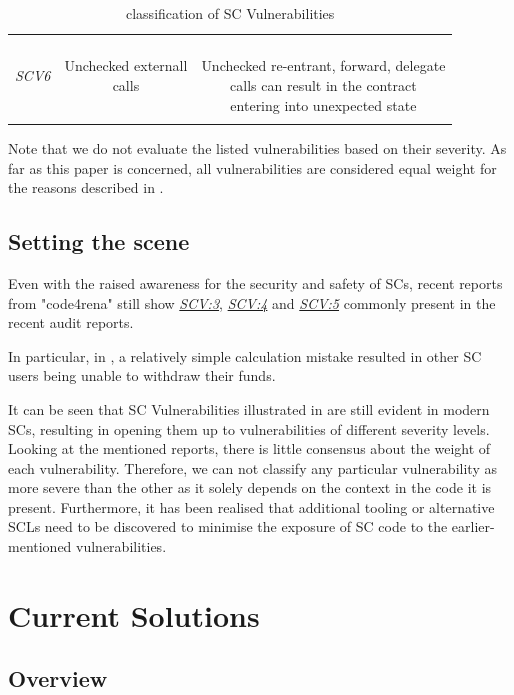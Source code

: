 \documentclass[oneside]{ecsproject}     %
\newcommand{\vref}[1]{\textit{\hyperref[#1]{#1}}}
\begin{document}
\begin{table}[!htb]
\begin{tabular}{ccc}
  \hline
  \textit{SCV6}\label{SCV:6} & \makecell{Unchecked externall\\calls} & \makecell{\\Unchecked re-entrant, forward, delegate\\calls can result in the contract\\entering into unexpected state}\\\\
  \bottomrule
  \end{tabular}
  \caption{classification of SC Vulnerabilities}
  \label{Table:classification}
\end{table}

Note that we do not evaluate the listed vulnerabilities based on their severity. 
As far as this paper is concerned, all vulnerabilities are considered equal weight for the reasons described in .

\section{Setting the scene} \label{Section:Scene}

Even with the raised awareness for the security and safety of SCs, recent reports from "code4rena" still show \vref{SCV:3}, \vref{SCV:4} and \vref{SCV:5}
commonly present in the recent audit reports\cite{arcade_report}\cite{ondo_report}\cite{centrifuge_report}.

In particular, in \cite{centrifuge_report}, a relatively simple calculation mistake resulted in other SC users being unable to withdraw their funds.

It can be seen that SC Vulnerabilities illustrated in  are still evident in modern SCs, resulting in opening them up to vulnerabilities of different severity levels.
Looking at the mentioned reports, there is little consensus about the weight of each vulnerability.
Therefore, we can not classify any particular vulnerability as more severe than the other as it solely depends on the context in the code it is present.
Furthermore, it has been realised that additional tooling or alternative SCLs need to be discovered to minimise the exposure of SC code to the earlier-mentioned vulnerabilities.

\chapter{Current Solutions}

\section{Overview}
\end{document}
